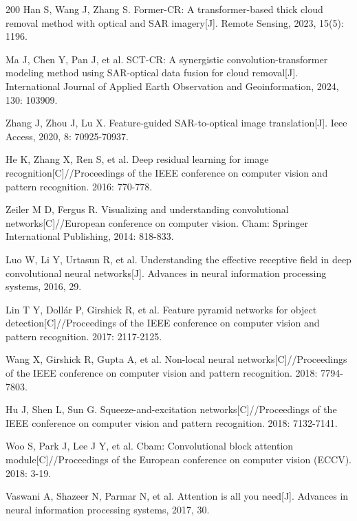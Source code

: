 \begin{thebibliography}{200}
Han S, Wang J, Zhang S. Former-CR: A transformer-based thick cloud removal method with optical and SAR imagery[J]. Remote Sensing, 2023, 15(5): 1196.

Ma J, Chen Y, Pan J, et al. SCT-CR: A synergistic convolution-transformer modeling method using SAR-optical data fusion for cloud removal[J]. International Journal of Applied Earth Observation and Geoinformation, 2024, 130: 103909.

% 
Zhang J, Zhou J, Lu X. Feature-guided SAR-to-optical image translation[J]. Ieee Access, 2020, 8: 70925-70937.


He K, Zhang X, Ren S, et al. Deep residual learning for image recognition[C]//Proceedings of the IEEE conference on computer vision and pattern recognition. 2016: 770-778.

% 
Zeiler M D, Fergus R. Visualizing and understanding convolutional networks[C]//European conference on computer vision. Cham: Springer International Publishing, 2014: 818-833.

Luo W, Li Y, Urtasun R, et al. Understanding the effective receptive field in deep convolutional neural networks[J]. Advances in neural information processing systems, 2016, 29.

Lin T Y, Dollár P, Girshick R, et al. Feature pyramid networks for object detection[C]//Proceedings of the IEEE conference on computer vision and pattern recognition. 2017: 2117-2125.

% 
Wang X, Girshick R, Gupta A, et al. Non-local neural networks[C]//Proceedings of the IEEE conference on computer vision and pattern recognition. 2018: 7794-7803.


% 
Hu J, Shen L, Sun G. Squeeze-and-excitation networks[C]//Proceedings of the IEEE conference on computer vision and pattern recognition. 2018: 7132-7141.

% 
Woo S, Park J, Lee J Y, et al. Cbam: Convolutional block attention module[C]//Proceedings of the European conference on computer vision (ECCV). 2018: 3-19.


Vaswani A, Shazeer N, Parmar N, et al. Attention is all you need[J]. Advances in neural information processing systems, 2017, 30.


\end{thebibliography}

